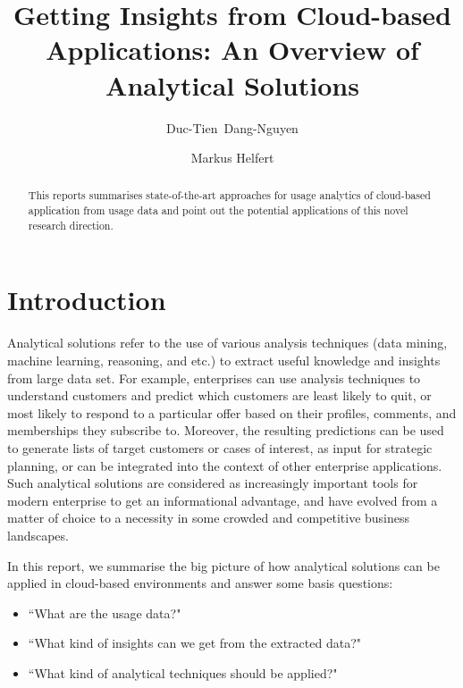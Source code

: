 \documentclass{llncs}
\begin{document}
\title{Getting Insights from Cloud-based Applications: An Overview of Analytical Solutions}


\author{Duc-Tien~Dang-Nguyen \and Markus Helfert }


\maketitle

\setcounter{footnote}{0}

\begin{abstract}
This reports summarises state-of-the-art approaches for usage analytics of cloud-based application from usage data and point out the potential applications of this novel research direction.
\end{abstract}

\section{Introduction}\label{sec:Introduction}
%
Analytical solutions refer to the use of various analysis
techniques (data mining, machine learning, reasoning, and etc.) to extract useful knowledge and insights from large data set. For example, enterprises can use analysis techniques to understand customers and predict which customers are least likely to quit, or most likely to respond to a particular offer based on their profiles, comments, and memberships they subscribe to. Moreover, the resulting predictions can be used to generate lists of target customers or cases of interest, as input for strategic planning, or can be integrated into the context
of other enterprise applications. Such analytical
solutions are considered as increasingly important tools for modern enterprise to get an informational advantage, and have evolved from a matter of choice to a necessity in some crowded and competitive business landscapes. 

In this report, we summarise the big picture of how analytical solutions can be applied in cloud-based environments and answer some basis questions: 
\begin{itemize}
	\item ``What are the usage data?"
	\item ``What kind of insights can we get from the extracted data?"
	\item ``What kind of analytical techniques should be applied?"
\end{itemize}
\end{document}
